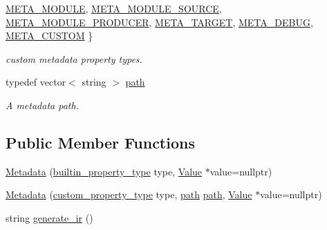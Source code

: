 \begin{DoxyCompactItemize}
\hyperlink{classeviir_1_1Metadata_a890ce3566bd1dc49d5b1da4abb9b8490ad189e84d060c629c555c0d875e26e7f5}{M\+E\+T\+A\+\_\+\+M\+O\+D\+U\+LE}, 
\newline
\hyperlink{classeviir_1_1Metadata_a890ce3566bd1dc49d5b1da4abb9b8490a4cf1ed5320fab8b379cab80128a5f947}{M\+E\+T\+A\+\_\+\+M\+O\+D\+U\+L\+E\+\_\+\+S\+O\+U\+R\+CE}, 
\newline
\hyperlink{classeviir_1_1Metadata_a890ce3566bd1dc49d5b1da4abb9b8490a01b5801c88ba15043f5fc1dacab08cab}{M\+E\+T\+A\+\_\+\+M\+O\+D\+U\+L\+E\+\_\+\+P\+R\+O\+D\+U\+C\+ER}, 
\newline
\hyperlink{classeviir_1_1Metadata_a890ce3566bd1dc49d5b1da4abb9b8490ab27ef44c17f2098f805f27a2336e7e14}{M\+E\+T\+A\+\_\+\+T\+A\+R\+G\+ET}, 
\newline
\hyperlink{classeviir_1_1Metadata_a890ce3566bd1dc49d5b1da4abb9b8490a6cf8530b9dac75b50afc0621ce40a9c8}{M\+E\+T\+A\+\_\+\+D\+E\+B\+UG}, 
\newline
\hyperlink{classeviir_1_1Metadata_a890ce3566bd1dc49d5b1da4abb9b8490a75edc14cde2b7b26bb6d760fc9ee756d}{M\+E\+T\+A\+\_\+\+C\+U\+S\+T\+OM}
 \}\begin{DoxyCompactList}\small\item\em custom metadata property types. \end{DoxyCompactList}
\item 
\mbox{\label{classeviir_1_1Metadata_ac613e5de0552301f9b7969d14eb5dffa}} 
typedef vector$<$ string $>$ \hyperlink{classeviir_1_1Metadata_ac613e5de0552301f9b7969d14eb5dffa}{path}
\begin{DoxyCompactList}\small\item\em A metadata path. \end{DoxyCompactList}\end{DoxyCompactItemize}
\subsection*{Public Member Functions}
\begin{DoxyCompactItemize}
\item 
\hyperlink{classeviir_1_1Metadata_a932b55404878eeef14ad7d4e7ed98f9e}{Metadata} (\hyperlink{classeviir_1_1Metadata_a372fe4af91ebc18a6d02354e8bcf23cf}{builtin\+\_\+property\+\_\+type} type, \hyperlink{classeviir_1_1Value}{Value} $\ast$value=nullptr)
\item 
\hyperlink{classeviir_1_1Metadata_afd2f484427fcdf9aa777d6471251b3ea}{Metadata} (\hyperlink{classeviir_1_1Metadata_a890ce3566bd1dc49d5b1da4abb9b8490}{custom\+\_\+property\+\_\+type} type, \hyperlink{classeviir_1_1Metadata_ac613e5de0552301f9b7969d14eb5dffa}{path} \hyperlink{classeviir_1_1Metadata_ac613e5de0552301f9b7969d14eb5dffa}{path}, \hyperlink{classeviir_1_1Value}{Value} $\ast$value=nullptr)
\item 
string \hyperlink{classeviir_1_1Metadata_ab4ac3feef2692e4ae984842224787934}{generate\+\_\+ir} ()
\end{DoxyCompactItemize}
